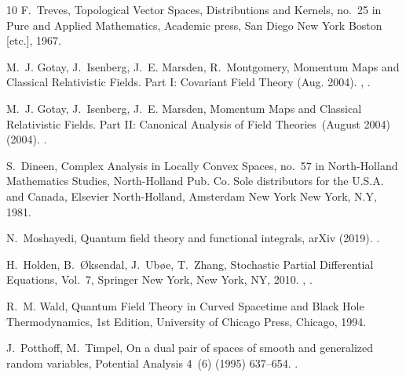 \documentclass{elsarticle}%
\begin{document}
\begin{thebibliography}{10}
    F.~Treves, Topological Vector Spaces, Distributions and Kernels, no.~25 in Pure and Applied Mathematics, Academic press, San Diego New York Boston [etc.], 1967.
    
    M.~J. Gotay, J.~Isenberg, J.~E. Marsden, R.~Montgomery, Momentum {{Maps}} and {{Classical Relativistic Fields}}. {{Part I}}: {{Covariant Field Theory}} (Aug. 2004).
    \newblock \href {http://arxiv.org/abs/physics/9801019} {}, \href {https://doi.org/10.48550/arXiv.physics/9801019} {}.
    
    M.~J. Gotay, J.~Isenberg, J.~E. Marsden, Momentum {{Maps}} and {{Classical Relativistic Fields}}. {{Part II}}: {{Canonical Analysis}} of {{Field Theories}}~(August 2004) (2004).
    \newblock \href {http://arxiv.org/abs/math-ph/0411032} {}.
    
    S.~Dineen, Complex Analysis in Locally Convex Spaces, no.~57 in North-{{Holland}} Mathematics Studies, {North-Holland Pub. Co. Sole distributors for the U.S.A. and Canada, Elsevier North-Holland}, Amsterdam New York New York, N.Y, 1981.
    
    N.~Moshayedi, Quantum field theory and functional integrals, arXiv (2019).
    \newblock \href {http://arxiv.org/abs/1902.08652} {}.
    
    H.~Holden, B.~{\O}ksendal, J.~Ub{\o}e, T.~Zhang, Stochastic {{Partial Differential Equations}}, Vol.~7, Springer New York, New York, NY, 2010.
    \newblock \href {http://arxiv.org/abs/1706.00538} {}, \href {https://doi.org/10.1007/978-0-387-89488-1} {}.
    
    R.~M. Wald, Quantum {{Field Theory}} in {{Curved Spacetime}} and {{Black Hole Thermodynamics}}, 1st Edition, University of Chicago Press, Chicago, 1994.
    
    J.~Potthoff, M.~Timpel, On a dual pair of spaces of smooth and generalized random variables, Potential Analysis 4~(6) (1995) 637--654.
    \newblock \href {https://doi.org/10.1007/BF02345829} {}.
    
    \end{thebibliography}
    
\end{document}
